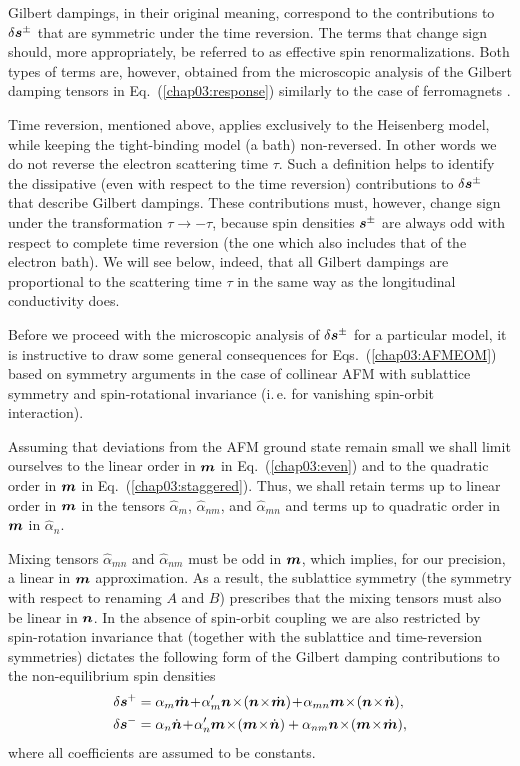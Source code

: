Gilbert dampings, in their original meaning, correspond to the contributions to $\delta\boldsymbol{s}^{\pm}$ that are symmetric under the time reversion. 
The terms that change sign should, more appropriately, be referred to as effective spin renormalizations. Both types of terms are, however, obtained from the microscopic analysis of the Gilbert damping tensors in Eq.~(\ref{chap03:response}) similarly to the case of ferromagnets \cite{AdoSTTGD2019}.

Time reversion, mentioned above, applies exclusively to the Heisenberg model, while keeping the tight-binding model (a bath) non-reversed. In other words we do not reverse the electron scattering time $\tau$. Such a definition helps to identify the dissipative (even with respect to the time reversion) contributions to $\delta\boldsymbol{s}^{\pm}$ that describe Gilbert dampings. These contributions must, however, change sign under the transformation $\tau \to -\tau$, because spin densities $\boldsymbol{s}^\pm$ are always odd with respect to complete time reversion (the one which also includes that of the electron bath). We will see below, indeed, that all Gilbert dampings are proportional to the scattering time $\tau$ in the same way as the longitudinal conductivity does.  

Before we proceed with the microscopic analysis of $\delta\boldsymbol{s}^{\pm}$ for a particular model, it is instructive to draw some general consequences for Eqs.~(\ref{chap03:AFMEOM}) based on symmetry arguments in the case of collinear AFM with sublattice symmetry and spin-rotational invariance (i.\,e. for vanishing spin-orbit interaction).  

Assuming that deviations from the AFM ground state remain small we shall limit ourselves to the linear order in $\boldsymbol{m}$ in Eq.~(\ref{chap03:even}) and to the quadratic order in $\boldsymbol{m}$ in Eq.~(\ref{chap03:staggered}).  Thus, we shall retain terms up to linear order in $\boldsymbol{m}$ in the tensors $\hat{\alpha}_{m}$, $\hat{\alpha}_{nm}$, and $\hat{\alpha}_{mn}$ and terms up to quadratic order in $\boldsymbol{m}$ in $\hat{\alpha}_n$. 

Mixing tensors $\hat{\alpha}_{mn}$ and $\hat{\alpha}_{nm}$ must be odd in $\boldsymbol{m}$, which implies, for our precision, a linear in $\boldsymbol{m}$ approximation. As a result, the sublattice symmetry (the symmetry with respect to renaming $A$ and $B$) prescribes that the mixing tensors must also be linear in $\boldsymbol{n}$. In the absence of spin-orbit coupling we are also restricted by spin-rotation invariance that (together with the sublattice and time-reversion symmetries) dictates the following form of the Gilbert damping contributions to the non-equilibrium spin densities
\beml
\label{chap03:gen}
\begin{align}
\label{chap03:even}
\delta \bb{s}^{+} & = \alpha_m \dot{\bb{m}}  \!+\! \alpha'_m \bb{n}  \!\times\! (\bb{n} \!\times\! \dot{\bb{m}}) \!+\!\alpha_{mn}\bb{m}  \!\times\!  (\bb{n}  \!\times\!  \dot{\bb{n}}),\\
\delta \bb{s}^{-} &= \alpha_n \dot{\bb{n}} \!+\! \alpha'_n \bb{m}  \!\times\! (\bb{m} \!\times\! \dot{\bb{n}}) + \alpha_{nm} \bb{n}\!\times\!(\bb{m}\!\times\! \dot{\bb{m}}),
\label{chap03:staggered}
\end{align}
\eml
where all coefficients are assumed to be constants.  

